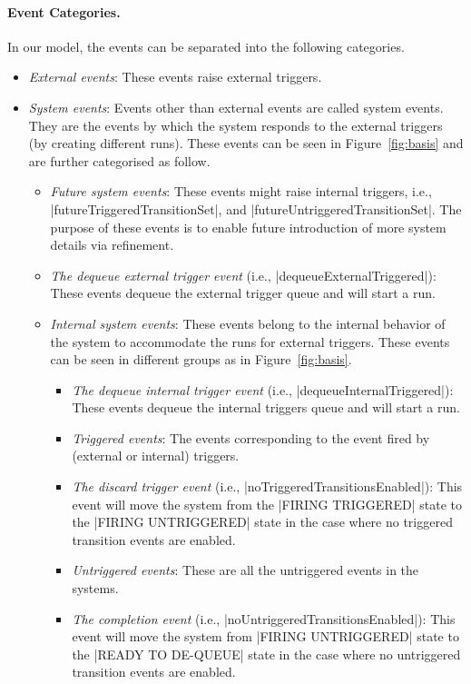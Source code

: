 \paragraph{Event Categories.} In our \EventB model, the events can
be separated into the following categories.
\begin{itemize}
\item \emph{External events}: These events raise external triggers.
  
\item \emph{System events}: Events other than external events are
  called system events. They are the events by which the system
  responds to the external triggers (by creating different runs).
  These events can be seen in Figure~\ref{fig:basis} and are further
  categorised as follow.
  \begin{itemize}
  \item \emph{Future system events}: These events might raise internal
    triggers, i.e., |futureTriggeredTransitionSet|, and
    |futureUntriggeredTransitionSet|.  The purpose of these events is
    to enable future introduction of more system details via
    refinement.
    
  \item \emph{The dequeue external trigger event} (i.e.,
    |dequeueExternalTriggered|): These events dequeue the
    external trigger queue and will start a run.

  \item \emph{Internal system events}: These events belong to the
    internal behavior of the system to accommodate the runs for external
    triggers.  These events can be seen in different groups as in
    Figure~\ref{fig:basis}.
    \begin{itemize}
    \item \emph{The dequeue internal trigger event} (i.e.,
      |dequeueInternalTriggered|): These events dequeue the
      internal triggers queue and will start a run.
    
    \item \emph{Triggered events}: The events corresponding to the
     event fired by (external or internal) triggers.

    \item \emph{The discard trigger event} (i.e.,
      |noTriggeredTransitionsEnabled|):  This event will move the system
      from the |FIRING TRIGGERED| state to the |FIRING UNTRIGGERED| state 
      in the case where no triggered transition events are enabled.
    
    \item \emph{Untriggered events}:  These are all the untriggered 
    events in the systems.

    \item \emph{The completion event} (i.e.,
      |noUntriggeredTransitionsEnabled|): This event will move the
      system from |FIRING UNTRIGGERED| state to the |READY TO DE-QUEUE|
      state in the case where no untriggered transition events are
      enabled.
    \end{itemize}
  \end{itemize}
\end{itemize}
